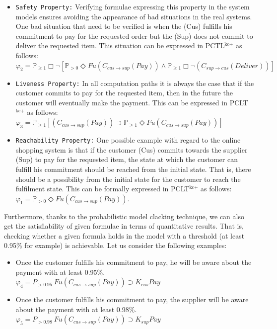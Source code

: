 \begin{itemize}
\item \texttt{Safety Property:} Verifying formulae expressing this property in the system models ensures avoiding the appearance of bad situations in the real systems. One bad situation that need to be verified is when the (Cus) fulfills his commitment to pay for the requested order but the (Sup) does not commit to deliver the requested item. This situation can be expressed in PCTL$^{\textrm{kc+}}$ as follows: \\
$\varphi_2= \mathbb{P}_{\geq1}\Box\neg[\mathbb{P}_{>0} \Diamond
Fu(C_{cus\to sup} (Pay))\wedge \mathbb{P}_{\geq1}\Box\neg
(C_{sup\to cus} (Deliver))]$

\item \texttt{Liveness Property:} In all computation paths it is always the case that if the customer commits to pay for the requested item, then in the future the customer will eventually make the payment. This can be expressed in PCLT$^{\textrm{kc+}}$ as follows:\\
$\varphi_3= \mathbb{P}_{\geq1}[(C_{cus\to sup} (Pay))\supset \mathbb{P}_{\geq1}\Diamond Fu(C_{cus\to sup} (Pay))]$

\item \texttt{Reachability Property:} One possible example with regard to the online shopping system is that if the customer (Cus) commits towards the supplier (Sup) to pay for the requested item, the state at which the customer can fulfill his commitment should be reached from the initial state. That is, there should be a possibility from the initial state for the customer to reach the fulfilment state. This can be formally expressed in PCLT$^{\textrm{kc+}}$ as follows:\\
$\varphi_1= \mathbb{P}_{>0} \Diamond Fu(C_{cus\to sup} (Pay))$.

\end{itemize}

Furthermore, thanks to the probabilistic model clacking technique,
we can also get the satisfiability of given formulae in terms of
quantitative results. That is, checking whether a given formula
holds in the model with a threshold (at least 0.95\% for example)
is achievable. Let us consider the following examples:

\begin{itemize}
    \item Once the customer fulfills his commitment to pay, he will be aware about the payment with at least 0.95\%.\\
      $\varphi_4 = P_{>0.95}~ Fu (C_{cus\to sup} (Pay)) \supset K_{cus} Pay$

    \item Once the customer fulfills his commitment to pay, the supplier will be aware about the payment  with at least 0.98\%.\\
      $\varphi_5 = P_{>0.98}~ Fu (C_{cus\to sup} (Pay)) \supset K_{sup} Pay$
\end{itemize}

